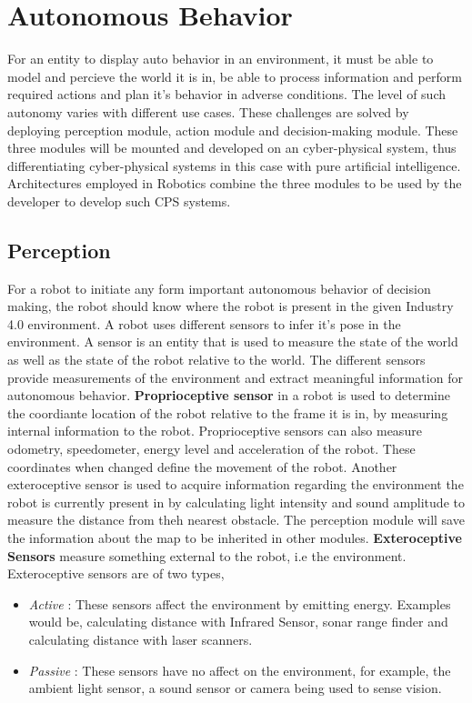 \section{Autonomous Behavior}
For an entity to display auto behavior in an environment, it must be able to model and percieve the world it is in, be able to process information
and perform required actions and plan it's behavior in adverse conditions. The level of such autonomy varies with different use cases. These challenges
are solved by deploying perception module, action module and decision-making module. These three modules will be mounted and developed on an cyber-physical
system, thus differentiating cyber-physical systems in this case with pure artificial intelligence. Architectures employed in Robotics combine the three modules
to be used by the developer to develop such CPS systems.
\subsection{Perception}
For a robot to initiate any form important autonomous behavior of decision making, the robot should know where the robot is present in the given Industry 4.0 environment. A robot uses different sensors to infer it's pose in the environment. A
sensor is an entity that is used to measure the state of the world as well as the state of the robot relative to the world. 
The different sensors provide measurements of the environment and extract meaningful information for autonomous behavior. \textbf{Proprioceptive sensor} in a robot is used to determine the coordiante location of the robot relative
to the frame it is in, by measuring internal information to the robot. Proprioceptive sensors can also measure odometry, speedometer, energy level and acceleration of the robot. These coordinates when changed define the movement of the robot. Another exteroceptive sensor is used to acquire information regarding the environment the
robot is currently present in by calculating light intensity and sound amplitude to measure the distance from theh nearest obstacle. The perception module will save the information about the map to be
inherited in other modules. \textbf{Exteroceptive Sensors} measure something external to the robot, i.e the environment. Exteroceptive sensors are of two types, 
\begin{itemize}
    \item \textit{Active} : These sensors affect the environment by emitting energy. Examples would be, calculating distance with Infrared Sensor, sonar range finder and calculating distance with laser scanners.
    \item \textit{Passive} : These sensors have no affect on the environment, for example, the ambient light sensor, a sound sensor or camera being used to sense vision.
\end{itemize} 

